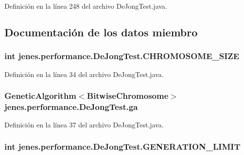 Definición en la línea 248 del archivo De\-Jong\-Test.\-java.



\subsection{Documentación de los datos miembro}
\hypertarget{classjenes_1_1performance_1_1_de_jong_test_a96e009580c2dc5f12763e85c90075813}{
\subsubsection[{C\-H\-R\-O\-M\-O\-S\-O\-M\-E\-\_\-\-S\-I\-Z\-E}]{\setlength{\rightskip}{0pt plus 5cm}int jenes.\-performance.\-De\-Jong\-Test.\-C\-H\-R\-O\-M\-O\-S\-O\-M\-E\-\_\-\-S\-I\-Z\-E\hspace{0.3cm}{\ttfamily [protected]}}}\label{classjenes_1_1performance_1_1_de_jong_test_a96e009580c2dc5f12763e85c90075813}


Definición en la línea 34 del archivo De\-Jong\-Test.\-java.

\hypertarget{classjenes_1_1performance_1_1_de_jong_test_af9f864ad4d54d913cbd97266a0a1c5a7}{
\subsubsection[{ga}]{\setlength{\rightskip}{0pt plus 5cm}Genetic\-Algorithm$<${\bf Bitwise\-Chromosome}$>$ jenes.\-performance.\-De\-Jong\-Test.\-ga\hspace{0.3cm}{\ttfamily [protected]}}}\label{classjenes_1_1performance_1_1_de_jong_test_af9f864ad4d54d913cbd97266a0a1c5a7}


Definición en la línea 37 del archivo De\-Jong\-Test.\-java.

\hypertarget{classjenes_1_1performance_1_1_de_jong_test_ae39588619e1072e384d5a3f7891ed6ec}{
\subsubsection[{G\-E\-N\-E\-R\-A\-T\-I\-O\-N\-\_\-\-L\-I\-M\-I\-T}]{\setlength{\rightskip}{0pt plus 5cm}int jenes.\-performance.\-De\-Jong\-Test.\-G\-E\-N\-E\-R\-A\-T\-I\-O\-N\-\_\-\-L\-I\-M\-I\-T\hspace{0.3cm}{\ttfamily [protected]}}}\label{classjenes_1_1performance_1_1_de_jong_test_ae39588619e1072e384d5a3f7891ed6ec}


